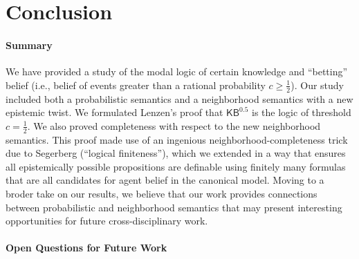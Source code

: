 \documentclass[12pt]{article}
\newcommand{\XXXcomment}[1]{}
\newcommand{\XXXcomment}[1]{\marginpar{\color{blue}{\footnotesize #1}}}
\theoremstyle{definition}
\newcommand{\KBeq}{{\mathsf{KB}^{\mathsf{0.5}}}}       %
\begin{document}
\section{Conclusion} 
\label{SectionFRW}

\paragraph{Summary}

We have provided a study of the modal logic of certain knowledge and
``betting'' belief (i.e., belief of events greater than a rational
probability $c\geq\frac 12$).  Our study included both a probabilistic
semantics and a neighborhood semantics with a new epistemic twist.  We
formulated Lenzen's proof that $\KBeq$ is the logic of threshold
$c=\frac 12$.  We also proved completeness with respect to the new
neighborhood semantics.  This proof made use of an ingenious
neighborhood-completeness trick due to Segerberg (``logical
finiteness''), which we extended in a way that ensures all
epistemically possible propositions are definable using finitely many
formulas that are all candidates for agent belief in the canonical
model. Moving to a broder take on our results, we believe that our
work provides connections between probabilistic and neighborhood
semantics that may present interesting opportunities for future
cross-disciplinary work.

\paragraph{Open Questions for Future Work}

\XXXcomment{BR: made enumeration of open questions, added new text on
  item 1 (high-threshold probability completeness).}
\end{document}

